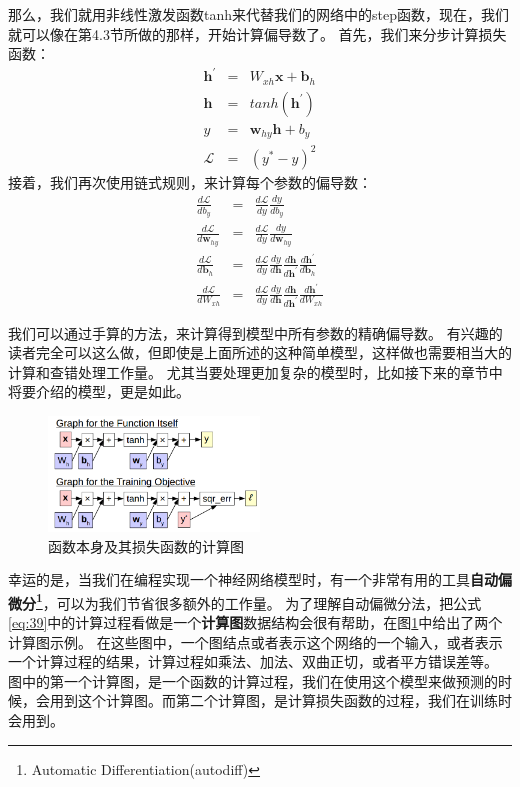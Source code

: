\documentclass[10pt,a4paper]{ctexart}
\begin{document}
那么，我们就用非线性激发函数tanh来代替我们的网络中的step函数，现在，我们就可以像在第4.3节所做的那样，开始计算偏导数了。
首先，我们来分步计算损失函数：
\begin{eqnarray}
 \textbf{h}^{'} & = & W_{xh}\textbf{x} + \textbf{b}_h \nonumber \\
 \textbf{h} & = & tanh(\textbf{h}^{'}) \nonumber \\
 y & = & \textbf{w}_{hy} \textbf{h} + b_y \nonumber \\
 \mathcal{L} & = & (y^* - y)^2 \label{eq:39}
\end{eqnarray}
接着，我们再次使用链式规则，来计算每个参数的偏导数：
\begin{eqnarray}
 \frac{d\mathcal{L}}{db_y} & = & \frac{d\mathcal{L}}{dy} \frac{dy}{db_y} \nonumber \\
 \frac{d\mathcal{L}}{d\textbf{w}_{hy}} & = & \frac{d\mathcal{L}}{dy} \frac{dy}{d\textbf{w}_{hy}} \nonumber \\
 \frac{d\mathcal{L}}{d\textbf{b}_h} & = & \frac{d\mathcal{L}}{dy} \frac{dy}{d\textbf{h}} \frac{d\textbf{h}}{d\textbf{h}^{'}} \frac{d\textbf{h}^{'}}{d\textbf{b}_h} \nonumber \\
 \frac{d\mathcal{L}}{dW_{xh}} & = & \frac{d\mathcal{L}}{dy} \frac{dy}{d\textbf{h}} \frac{d\textbf{h}}{d\textbf{h}^{'}} \frac{d\textbf{h}^{'}}{dW_{xh}} \label{eq:40}
\end{eqnarray}

我们可以通过手算的方法，来计算得到模型中所有参数的精确偏导数。
有兴趣的读者完全可以这么做，但即使是上面所述的这种简单模型，这样做也需要相当大的计算和查错处理工作量。
尤其当要处理更加复杂的模型时，比如接下来的章节中将要介绍的模型，更是如此。

\begin{figure}[H]
\centering
\includegraphics[width=0.5\textwidth]{fig10.png}
\caption{函数本身及其损失函数的计算图}
\label{fig:10}
\end{figure}

幸运的是，当我们在编程实现一个神经网络模型时，有一个非常有用的工具\textbf{自动偏微分\footnote{Automatic Differentiation(autodiff)}}\cite{wengert1964simple,andreas1991dif}，可以为我们节省很多额外的工作量。
为了理解自动偏微分法，把公式\ref{eq:39}中的计算过程看做是一个\textbf{计算图}数据结构会很有帮助，在图\ref{fig:10}中给出了两个计算图示例。
在这些图中，一个图结点或者表示这个网络的一个输入，或者表示一个计算过程的结果，计算过程如乘法、加法、双曲正切，或者平方错误差等。
图中的第一个计算图，是一个函数的计算过程，我们在使用这个模型来做预测的时候，会用到这个计算图。而第二个计算图，是计算损失函数的过程，我们在训练时会用到。
\end{document}
